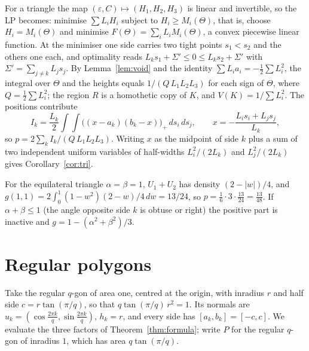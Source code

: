 \documentclass[11pt]{amsart}
\theoremstyle{remark}\newtheorem{remark}[theorem]{Remark}
\begin{document}
For a triangle the map $(\varepsilon,C)\mapsto(H_1,H_2,H_3)$ is linear and invertible, so the LP becomes: minimise
$\sum L_iH_i$ subject to $H_i\ge M_i(\Theta)$, that is, choose $H_i=M_i(\Theta)$ and minimise
$F(\Theta)=\sum_iL_iM_i(\Theta)$, a convex piecewise linear function. At the minimiser one side carries two tight
points $s_1<s_2$ and the others one each, and optimality reads $L_ks_1+\Sigma'\le0\le L_ks_2+\Sigma'$ with
$\Sigma'=\sum_{j\ne k}L_js_j$. By Lemma~\ref{lem:void} and the identity $\sum L_ia_i=-\frac12\sum L_i^2$, the
integral over $\Theta$ and the heights equals $1/(Q\,L_1L_2L_3)$ for each sign of $\Theta$, where
$Q=\frac12\sum L_i^2$; the region $R$ is a homothetic copy of $K$, and $V(K)=1/\sum L_i^2$. The positions contribute
\[
I_k=\frac{L_k}{2}\int\!\!\int\big((x-a_k)(b_k-x)\big)_+\,ds_i\,ds_j,\qquad x=-\frac{L_is_i+L_js_j}{L_k},
\]
so $p=2\sum_kI_k/(Q\,L_1L_2L_3)$. Writing $x$ as the midpoint of side $k$ plus a sum of two independent uniform
variables of half-widths $L_i^2/(2L_k)$ and $L_j^2/(2L_k)$ gives Corollary~\ref{cor:tri}.

For the equilateral triangle $\alpha=\beta=1$, $U_1+U_2$ has density $(2-|w|)/4$, and
$g(1,1)=2\int_0^1(1-w^2)(2-w)/4\,dw=13/24$, so $p=\frac16\cdot3\cdot\frac{13}{24}=\frac{13}{48}$.
If $\alpha+\beta\le1$ (the angle opposite side $k$ is obtuse or right) the positive part is inactive and
$g=1-(\alpha^2+\beta^2)/3$.

\section{Regular polygons}\label{sec:reg}

Take the regular $q$-gon of area one, centred at the origin, with inradius $r$ and half side $c=r\tan(\pi/q)$, so that
$q\tan(\pi/q)\,r^2=1$. Its normals are $u_k=(\cos\frac{2\pi k}q,\sin\frac{2\pi k}q)$, $h_k=r$, and every side has
$[a_k,b_k]=[-c,c]$. We evaluate the three factors of Theorem~\ref{thm:formula}; write $P$ for the regular $q$-gon of
inradius $1$, which has area $q\tan(\pi/q)$.
\end{document}
